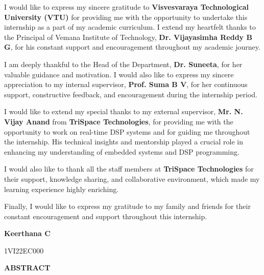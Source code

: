 \documentclass[12pt,a4paper]{report}
\begin{document}
\vspace{0.5cm}
\setlength{\parskip}{1em}
\begin{onehalfspacing}

I would like to express my sincere gratitude to \textbf{Visvesvaraya Technological University (VTU)} for providing me with the opportunity to undertake this internship as a part of my academic curriculum. I extend my heartfelt thanks to the Principal of Vemana Institute of Technology, \textbf{Dr. Vijayasimha Reddy B G}, for his constant support and encouragement throughout my academic journey.


I am deeply thankful to the Head of the Department, \textbf{Dr. Suneeta}, for her valuable guidance and motivation. I would also like to express my sincere appreciation to my internal supervisor, \textbf{Prof. Suma B V}, for her continuous support, constructive feedback, and encouragement during the internship period.


I would like to extend my special thanks to my external supervisor, \textbf{Mr. N. Vijay Anand} from \textbf{TriSpace Technologies}, for providing me with the opportunity to work on real-time DSP systems and for guiding me throughout the internship. His technical insights and mentorship played a crucial role in enhancing my understanding of embedded systems and DSP programming.


I would also like to thank all the staff members at \textbf{TriSpace Technologies} for their support, knowledge sharing, and collaborative environment, which made my learning experience highly enriching.


Finally, I would like to express my gratitude to my family and friends for their constant encouragement and support throughout this internship.

\end{onehalfspacing}
\setlength{\parskip}{0.4em}

\vspace{1cm}
\begin{flushright}
\textbf{Keerthana C}\par
1VI22EC000\par
\end{flushright}

\newpage
\begin{center}
{\LARGE \textbf{ABSTRACT}\par}
\end{center}
\end{document}
